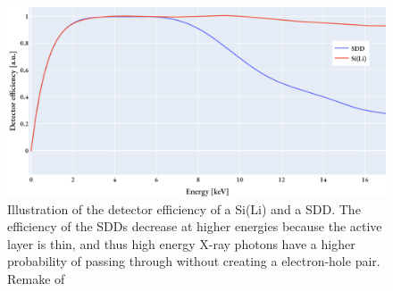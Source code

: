 \begin{figure}[ht]
    \centering
    \includegraphics[width=0.8\linewidth]{figures/detector_efficiency_illustration.png}
    \caption{
        Illustration of the detector efficiency of a Si(Li) and a SDD.
        The efficiency of the SDDs decrease at higher energies because the active layer is thin, and thus high energy X-ray photons have a higher probability of passing through without creating a electron-hole pair.
        Remake of 
    }
    \label{fig:detector_efficiency}
\end{figure}























